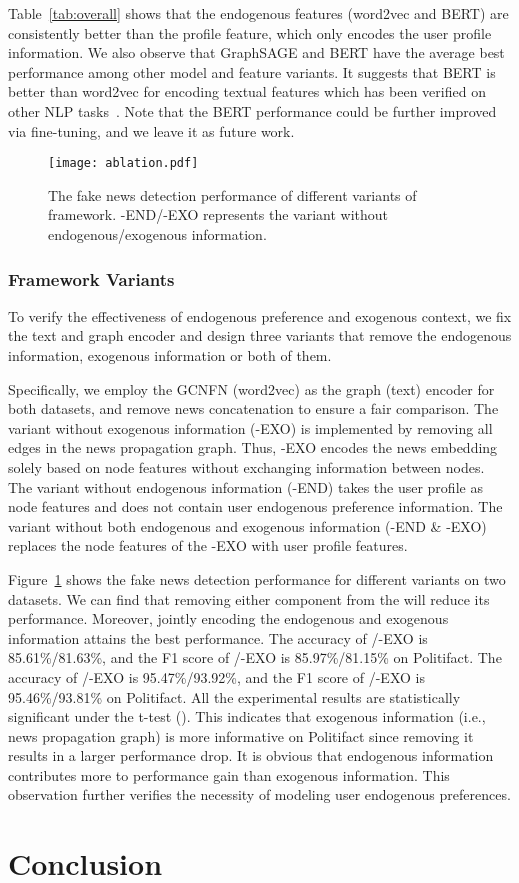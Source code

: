 \documentclass[sigconf]{acmart}
\newcommand\UPFD{\xspace}
\begin{document}
Table~\ref{tab:overall} shows that the endogenous features (word2vec and BERT) are consistently better than the profile feature, which only encodes the user profile information.
We also observe that GraphSAGE and BERT have the average best performance among other model and feature variants.
It suggests that BERT is better than word2vec for encoding textual features which has been verified on other NLP tasks~\cite{devlin2018bert}.
Note that the BERT performance could be further improved via fine-tuning, and we leave it as future work.


\begin{figure}[h]
    \centering
    \texttt{[image: ablation.pdf]}
    \caption{The fake news detection performance of different variants of \UPFD framework. -END/-EXO represents the \UPFD variant without endogenous/exogenous information.}
    \label{fig:ablation}
\end{figure}


\subsubsection{Framework Variants}
To verify the effectiveness of endogenous preference and exogenous context, we fix the text and graph encoder and design three \UPFD variants that remove the endogenous information, exogenous information or both of them.

Specifically, we employ the GCNFN (word2vec) as the graph (text) encoder for both datasets, and remove news concatenation to ensure a fair comparison.
The \UPFD variant without exogenous information (-EXO) is implemented by removing all edges in the news propagation graph.
Thus, -EXO encodes the news embedding solely based on node features without exchanging information between nodes.
The \UPFD variant without endogenous information (-END) takes the user profile as node features and does not contain user endogenous preference information.
The \UPFD variant without both endogenous and exogenous information (-END \& -EXO) replaces the node features of the -EXO with user profile features.

Figure~\ref{fig:ablation} shows the fake news detection performance for different \UPFD variants on two datasets.
We can find that removing either component from the \UPFD will reduce its performance.
Moreover, jointly encoding the endogenous and exogenous information attains the best performance.
The accuracy of \UPFD/-EXO is 85.61\%/81.63\%, and the F1 score of \UPFD/-EXO is 85.97\%/81.15\% on Politifact.
The accuracy of \UPFD/-EXO is 95.47\%/93.92\%, and the F1 score of \UPFD/-EXO is 95.46\%/93.81\% on Politifact.
All the experimental results are statistically significant under the t-test ().
This indicates that exogenous information (i.e., news propagation graph) is more informative on Politifact since removing it results in a larger performance drop.
It is obvious that endogenous information contributes more to performance gain than exogenous information.
This observation further verifies the necessity of modeling user endogenous preferences. \section{Conclusion}
\end{document}
